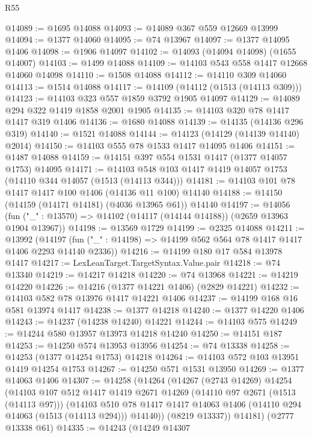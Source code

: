 \begin{lexlean}{R55}
\begin{coremodule}
{{@14089 := @1695 @14088
@14093 := @14089 @367 @559 @12669 @13999
@14094 := @1377 @14060
@14095 := @74 @13967
@14097 := @1377 @14095 @1406
@14098 := @1906 @14097
@14102 := @14093 (@14094 @14098) (@1655 @14007)
@14103 := @1499 @14088
@14109 := @14103 @543 @558 @1417 @12668 @14060 @14098
@14110 := @1508 @14088
@14112 := @14110 @309 @14060
@14113 := @1514 @14088
@14117 := @14109 (@14112 (@1513 (@14113 @309)))
@14123 := @14103 @323 @557 @1859 @3792 @1905 @14097
@14129 := @14089 @294 @322 @1419 @1858 @2001 @1905
@14135 := @14103 @320 @78 @1417 @1417 @319 @1406
@14136 := @1680 @14088
@14139 := @14135 (@14136 @296 @319)
@14140 := @1521 @14088
@14144 := @14123 (@14129 (@14139 @14140) @2014)
@14150 := @14103 @555 @78 @1533 @1417 @14095 @1406
@14151 := @1487 @14088
@14159 := @14151 @397 @554 @1531 @1417 (@1377 @14057 @1753) @14095
@14171 := @14103 @548 @103 @1417 @1419 @14057 @1753 (@14110 @344 @14057 (@1513 (@14113 @344)))
@14181 := @14103 @101 @78 @1417 @1417 @100 @1406 (@14136 @11 @100) @14140
@14188 := @14150 (@14159 (@14171 @14181) (@4036 @13965 @61)) @14140
@14197 := @14056 (fun ("_" : @13570) => @14102 (@14117 (@14144 @14188)) (@2659 @13963 @1904 @13967))
@14198 := @13569 @1729
@14199 := @2325 @14088
@14211 := @13992
    (@14197 (fun ("_" : @14198) => @14199 @562 @564 @78 @1417 @1417 @1406 @2293 @14140 @2336))
@14216 := @14199 @180 @17 @584 @13978 @1417
@14217 := LexLeanTarget.TargetSyntax.Value.pair
@14218 := @74 @13340
@14219 := @14217 @14218
@14220 := @74 @13968
@14221 := @14219 @14220
@14226 := @14216 (@1377 @14221 @1406) (@2829 @14221)
@14232 := @14103 @582 @78 @13976 @1417 @14221 @1406
@14237 := @14199 @168 @16 @581 @13974 @1417
@14238 := @1377 @14218
@14240 := @1377 @14220 @1406
@14243 := @14237 (@14238 @14240) @14221
@14244 := @14103 @575
@14249 := @14244 @580 @13957 @13973 @14218 @14240
@14250 := @14151 @187
@14253 := @14250 @574 @13953 @13956
@14254 := @74 @13338
@14258 := @14253 (@1377 @14254 @1753) @14218
@14264 := @14103 @572 @103 @13951 @1419 @14254 @1753
@14267 := @14250 @571 @1531 @13950
@14269 := @1377 @14063 @1406
@14307 := @14258
    (@14264
      (@14267
        (@2743 @14269)
        @14254
        (@14103
          @107
          @512
          @1417
          @1419
          @2671
          @14269
          (@14110 @97 @2671 (@1513 (@14113 @97)))
          (@14103
            @510
            @78
            @1417
            @1417
            @14063
            @1406
            (@14110 @294 @14063 (@1513 (@14113 @294)))
            @14140))
        (@8219 @13337))
      @14181)
    (@2777 @13338 @61)
@14335 := @14243
    (@14249
      @14307
}}
\end{coremodule}
\end{lexlean}
